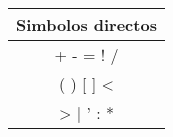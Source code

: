 \begin{center}
	\begin{tabular}{|c|}
		\hline
		Simbolos directos\\
		\hline
		+ \hspace{30pt} - \hspace{30pt} = \hspace{30pt} ! \hspace{30pt} /\\
		( \hspace{30pt} ) \hspace{30pt} [ \hspace{30pt} ] \hspace{30pt} <\\
		> \hspace{30pt} | \hspace{30pt} ' \hspace{30pt} : \hspace{30pt} *\\
		\hline	
	\end{tabular}
\end{center}

